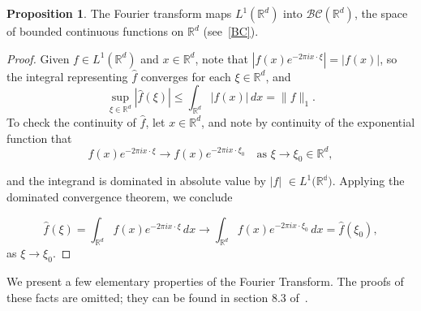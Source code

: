 \documentclass[12pt,a4paper]{report}
\theoremstyle{definition}
\newtheorem{proposition}{Proposition}
\begin{document}
\begin{proposition} \label{prop4}
The Fourier transform maps \( L^1(\mathbb{R}^d) \) into \( \mathcal{BC}(\mathbb{R}^d) \), the space of bounded continuous functions on \( \mathbb{R}^d \) (see~\ref{BC}).
\end{proposition}

\begin{proof}
Given $f \in L^1(\mathbb{R}^d)$ and $x \in \mathbb{R}^d$, note that \( \left| f(x)e^{-2\pi i x \cdot \xi} \right| = |f(x)| \), so the integral representing \( \widehat{f} \) converges for each \( \xi \in  \mathbb{R}^d\), and
\[
\sup_{\xi \in \mathbb{R}^d} |\widehat{f}(\xi)| \leq \int_{\mathbb{R}^d} |f(x)| \, dx = \|f\|_1.
\]
To check the continuity of $\widehat{f}$, let \( x \in \mathbb{R}^d\), and note by continuity of the exponential function that
\[
f(x)e^{-2\pi i x \cdot \xi} \to f(x)e^{-2\pi i x \cdot \xi_0} \quad \text{as } \xi \to \xi_0 \in \mathbb{R}^d,
\]

and the integrand is dominated in absolute value by \( |f| \) $\in L^1(\mathbb{R^d)}$. Applying the dominated convergence theorem, we conclude


\[
\widehat{f}(\xi) = \int_{\mathbb{R}^d} f(x)e^{-2\pi i x \cdot \xi} \, dx \to \int_{\mathbb{R}^d} f(x)e^{-2\pi i x \cdot \xi_0} \, dx = \widehat{f}(\xi_0),
\]
as \( \xi \to \xi_0 \).
\end{proof}

We present a few elementary properties of the Fourier Transform. The proofs of these facts are omitted; they can be found in section 8.3 of~\cite{folland1999real}.
\end{document}
